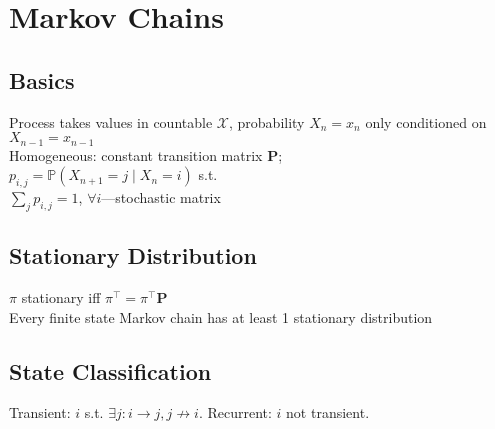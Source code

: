 \section{Markov Chains}
	\subsection*{Basics}
	Process takes values in countable $\mathcal{X}$, probability $X_{n} = x_{n}$ only conditioned on $X_{n - 1} = x_{n - 1}$\\
	Homogeneous: constant transition matrix $\mathbf{P}$;\\
	$p_{i,j} = \mathbb{P}\left(X_{n+1} = j\mid X_{n} = i\right)$ s.t.\\
	$\sum_{j}p_{i,j} = 1$, $\forall i$---stochastic matrix
	
	\subsection*{Stationary Distribution}
	$\pi$ stationary iff $\pi^{\intercal} = \pi^{\intercal}\mathbf{P}$\\
	Every finite state Markov chain has at least 1 stationary distribution
	
	\subsection*{State Classification}
	Transient: $i$ s.t. $\exists j: i\to j, j\not\to i$.
	Recurrent: $i$ not transient.
